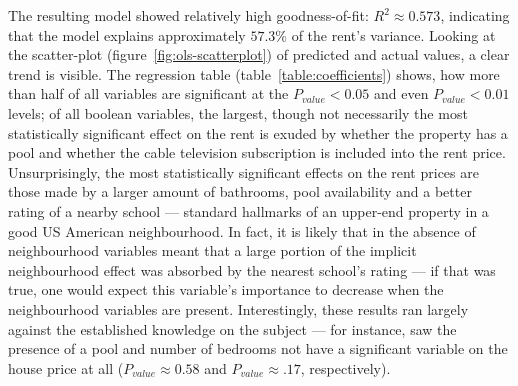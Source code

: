 \documentclass[12pt]{report}
\begin{document}
The resulting model showed relatively high goodness-of-fit: $R^2\approx0.573$, indicating that the model explains approximately $57.3\%$ of the rent's variance. Looking at the scatter-plot (figure~\ref{fig:ols-scatterplot}) of predicted and actual values, a clear trend is visible. The regression table (table~\ref{table:coefficients}) shows, how more than half of all variables are significant at the $P_{value}<0.05$ and even $P_{value}<0.01$ levels; of all boolean variables, the largest, though not necessarily the most statistically significant effect on the rent is exuded by whether the property has a pool and whether the cable television subscription is included into the rent price. Unsurprisingly, the most statistically significant effects on the rent prices are those made by a larger amount of bathrooms, pool availability and a better rating of a nearby school --- standard hallmarks of an upper-end property in a good US American neighbourhood. In fact, it is likely that in the absence of neighbourhood variables meant that a large portion of the implicit neighbourhood effect was absorbed by the nearest school's rating --- if that was true, one would expect this variable's importance to decrease when the neighbourhood variables are present. Interestingly, these results ran largely against the established knowledge on the subject --- for instance, \textcite{zietz2008} saw the presence of a pool and number of bedrooms not have a significant variable on the house price at all ($P_{value}\approx 0.58$ and $P_{value}\approx .17$, respectively).
\end{document}
